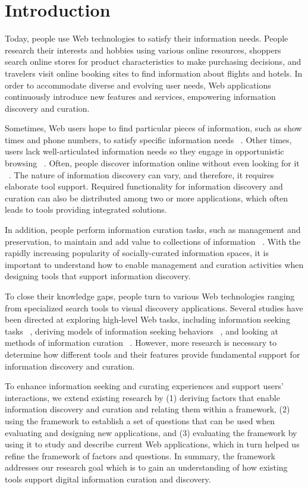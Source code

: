 \documentclass{casconpaper}
\begin{document}
{\section{Introduction}
Today, people use Web technologies to satisfy their information needs. People research their interests and hobbies using various online resources, shoppers search online stores for product characteristics to make purchasing decisions, and travelers visit online booking sites to find information about flights and hotels. In order to accommodate diverse and evolving user needs, Web applications continuously introduce new features and services, empowering information discovery and curation.  

Sometimes, Web users hope to find particular pieces of information, such as show times and phone numbers, to satisfy specific information needs ~\cite{proper}. Other times, users lack well-articulated information needs so they engage in opportunistic browsing ~\cite{lindley}. Often, people discover information online without even looking for it ~\cite{bates1986}. The nature of information discovery can vary, and therefore, it requires elaborate tool support. Required functionality for information discovery and curation can also be distributed among two or more applications, which often leads to tools providing integrated solutions.

In addition, people perform information curation tasks, such as management and preservation, to maintain and add value to collections of information ~\cite{beagrie}. With the rapidly increasing popularity of socially-curated information spaces, it is important to understand how to enable management and curation activities when designing tools that support information discovery.

To close their knowledge gaps, people turn to various Web technologies ranging from specialized search tools to visual discovery applications. Several studies have been directed at exploring high-level Web tasks, including information seeking tasks ~\cite{kellar2006, kellar2007, morrison, sellen}, deriving models of information seeking behaviors ~\cite{choo, ellis1989, ellis1993, ellis1997, bates1986, bates2002}, and looking at methods of information curation ~\cite{beagrie, wittaker}. However, more research is necessary to determine how different tools and their features provide fundamental support for information discovery and curation.

To enhance information seeking and curating experiences and support users' interactions, we extend existing research by (1) deriving factors that enable information discovery and curation and relating them within a framework, (2) using the framework to establish a set of questions that can be used when evaluating and designing new applications, and (3) evaluating the framework by using it to study and describe current Web applications, which in turn helped us refine the framework of factors and questions. In summary, the framework addresses our research goal which is to gain an understanding of how existing tools support digital information curation and discovery. 

}
\end{document}
